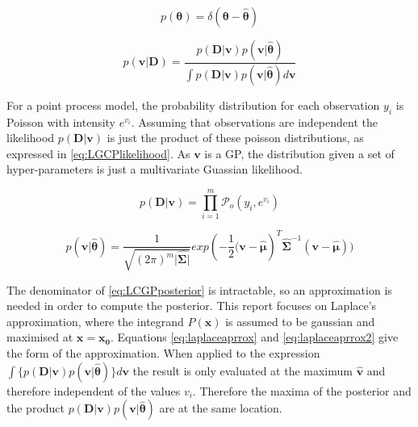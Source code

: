 \documentclass[a4paper,11pt]{report}
\begin{document}
\begin{equation}
p(\boldsymbol{\theta}) = \delta(\boldsymbol{\theta} - \hat{\boldsymbol{\theta}})
\end{equation}

\begin{equation} \label{eq:LCGPposterior2}
p(\mathbf{v | D}) = \frac{p(\mathbf{D|v})p(\mathbf{v}|\hat{\boldsymbol{\theta}}) }{\int{p(\mathbf{D|v})p(\mathbf{v}|\hat{\boldsymbol{\theta}}) d\mathbf{v}}}
\end{equation}

\doublespacing

For a point process model, the probability distribution for each observation \(y_i\) is Poisson with intensity \(e^{v_i}\). Assuming that observations are independent the likelihood \(p(\mathbf{D|v})\) is just the product of these poisson distributions, as expressed in \ref{eq:LGCPlikelihood}. As \(\mathbf{v}\) is a GP, the distribution given a set of hyper-parameters is just a multivariate Guassian likelihood. 

\singlespacing

\begin{equation} \label{eq:LGCPlikelihood}
p(\mathbf{D|v}) = \prod_{i=1}^{m} \mathcal{P}_o (y_i, e^{v_i})
\end{equation}

\begin{equation}
p(\mathbf{v}|\hat{\boldsymbol{\theta}}) = \frac{1}{\sqrt{(2\pi)^{m} |\hat{\boldsymbol{\Sigma|}}}} exp(- \frac{1}{2} \mathbf{(v}-\hat{\boldsymbol{\mu}})^{T}\hat{\boldsymbol{\Sigma}}^{-1}(\mathbf{v}-\hat{\boldsymbol{\mu}}))
\end{equation}

\doublespacing

The denominator of \ref{eq:LCGPposterior} is intractable, so an approximation is needed in order to compute the posterior. This report focuses on Laplace's approximation, where the integrand \(P(\mathbf{x})\) is assumed to be gaussian and maximised at \(\mathbf{x=x_0}\). Equations \ref{eq:laplaceaprrox} and \ref{eq:laplaceaprrox2} give the form of the approximation. \cite{Mackay} When applied to the expression \(\int{\{p(\mathbf{D|v}) p(\mathbf{v}|\hat{\boldsymbol{\theta}})\} d\mathbf{v}} \) the result is only evaluated at the maximum \(\hat{\mathbf{v}}\) and therefore independent of the values \(v_i\). Therefore the maxima of the posterior and the product \(p(\mathbf{D|v}) p(\mathbf{v}|\hat{\boldsymbol{\theta}})\) are at the same location.
\end{document}
